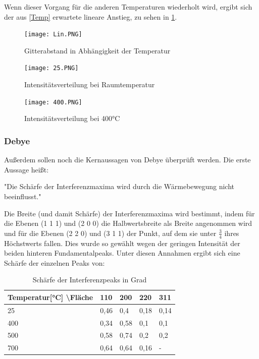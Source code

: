 \documentclass[
	a4paper,
	12pt,
	pagesize,
	ngerman
]{scrartcl}
\begin{document}
Wenn dieser Vorgang für die anderen Temperaturen wiederholt wird, ergibt sich der aus \cref{Temp} erwartete lineare Anstieg, zu sehen in \cref{Lin}.
\begin{figure}[h]
	\centering
	\texttt{[image: Lin.PNG]}
	\caption{Gitterabstand in Abhängigkeit der Temperatur}
	\label{Lin}
\end{figure}

\begin{figure}[h]
	\centering
	\texttt{[image: 25.PNG]}
	\caption{Intensitätsverteilung bei Raumtemperatur}
	\label{25}
\end{figure}


\begin{figure}[h]
	\centering
	\texttt{[image: 400.PNG]}
	\caption{Intensitätsverteilung bei 400°C}
	\label{400}
\end{figure}

\subsubsection{Debye}

Außerdem sollen noch die Kernaussagen von Debye überprüft werden. Die erste Aussage heißt:

"Die Schärfe der Interferenzmaxima wird durch die Wärmebewegung nicht beeinflusst."


Die Breite (und damit Schärfe) der Interferenzmaxima wird bestimmt, indem für die Ebenen (1 1 1) und (2 0 0) die Halbwertsbreite als Breite angenommen wird und für die Ebenen (2 2 0) und (3 1 1) der Punkt, auf dem sie unter $\frac{3}{4}$ ihres Höchstwerts fallen. Dies wurde so gewählt wegen der geringen Intensität der beiden hinteren Fundamentalpeaks. Unter diesen Annahmen ergibt sich eine Schärfe der einzelnen Peaks von:
\begin{table}[h]
\caption{Schärfe der Interferenzpeaks in Grad}
\begin{tabular}{l|llll}
Temperatur[°C] \textbackslash{}Fläche & 110  & 200  & 220  & 311  \\ \hline
25                               & 0,46 & 0,4  & 0,18 & 0,14 \\
400                              & 0,34 & 0,58 & 0,1  & 0,1  \\
500                              & 0,58 & 0,74 & 0,2  & 0,2  \\
700                              & 0,64 & 0,64 & 0,16 & -   
\end{tabular}
\end{table}
\end{document}
